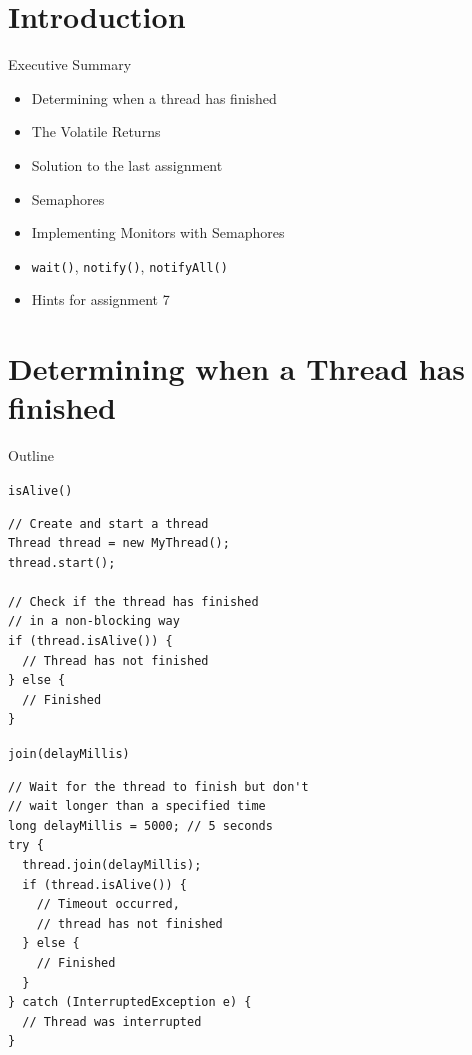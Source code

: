 \section*{Introduction}

\begin{frame}{Executive Summary}
  \begin{itemize}
  \item Determining when a thread has finished
  \item The Volatile Returns
  \item Solution to the last assignment
  \item Semaphores
  \item Implementing Monitors with Semaphores
  \item \lstinline!wait()!, \lstinline!notify()!,
    \lstinline!notifyAll()!
  \item Hints for assignment 7
  \end{itemize}
\end{frame}


\section{Determining when a Thread has finished}

\begin{frame}{Outline}
  \tableofcontents[current]
\end{frame}

\begin{frame}[fragile]{\lstinline{isAlive()}}
\begin{lstlisting}
// Create and start a thread 
Thread thread = new MyThread(); 
thread.start(); 

// Check if the thread has finished 
// in a non-blocking way 
if (thread.isAlive()) { 
  // Thread has not finished 
} else { 
  // Finished 
} 
\end{lstlisting}
\end{frame}

\begin{frame}[fragile]{\lstinline{join(delayMillis)}}
\begin{lstlisting}
// Wait for the thread to finish but don't 
// wait longer than a specified time 
long delayMillis = 5000; // 5 seconds 
try { 
  thread.join(delayMillis); 
  if (thread.isAlive()) { 
    // Timeout occurred, 
    // thread has not finished 
  } else { 
    // Finished 
  } 
} catch (InterruptedException e) { 
  // Thread was interrupted 
} 
\end{lstlisting}
\end{frame}

